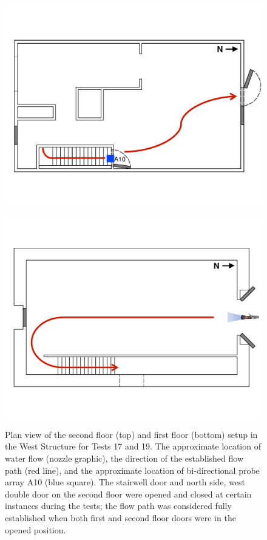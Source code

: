 \documentclass[12pt,oneside]{book}
\begin{document}
\begin{figure}[!ht]
	\includegraphics[width=\columnwidth]{../Figures/Floor_Plans/Specific_Tests/West_Hose_Test_2nd_Floor_Annotated}
	\\~\\
	\includegraphics[width=\columnwidth]{../Figures/Floor_Plans/Specific_Tests/West_Hose_Test_19_1st_Floor_Annotated}
	\caption[Plan view of the West Structure setup for Tests 17 and 19.]{Plan view of the second floor (top) and first floor (bottom) setup in the West Structure for Tests 17 and 19. The approximate location of water flow (nozzle graphic), the direction of the established flow path (red line), and the approximate location of bi-directional probe array A10 (blue square). The stairwell door and north side, west double door on the second floor were opened and closed at certain instances during the tests; the flow path was considered fully established when both first and second floor doors were in the opened position.}
	\label{fig:flow_path_2}
\end{figure}
\FloatBarrier
\end{document}
